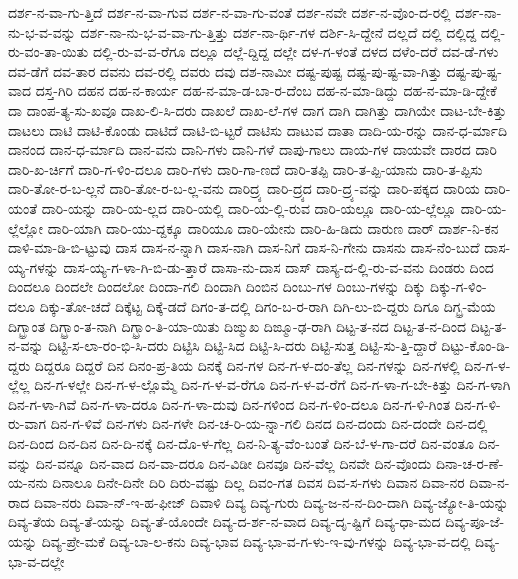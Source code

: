 {ದರ್ಶ-ನ-ವಾ-ಗು-ತ್ತಿದೆ
ದರ್ಶ-ನ-ವಾ-ಗುವ
ದರ್ಶ-ನ-ವಾ-ಗು-ವಂತೆ
ದರ್ಶ-ನವೇ
ದರ್ಶ-ನ-ವೊಂ-ದ-ರಲ್ಲಿ
ದರ್ಶ-ನಾ-ನು-ಭ-ವ-ವನ್ನು
ದರ್ಶ-ನಾ-ನು-ಭ-ವ-ವಾ-ಗು-ತ್ತಿತ್ತು
ದರ್ಶ-ನಾ-ರ್ಥಿ-ಗಳ
ದರ್ಶಿ-ಸಿ-ದ್ದೇನೆ
ದಲ್ಲದೆ
ದಲ್ಲಿ
ದಲ್ಲಿದ್ದ
ದಲ್ಲಿ-ರು-ವಂ-ತಾ-ಯಿತು
ದಲ್ಲಿ-ರು-ವ-ವ-ರೆಗೂ
ದಲ್ಲೂ
ದಲ್ಲೆ-ದ್ದಿದ್ದ
ದಲ್ಲೇ
ದಳ-ಗ-ಳಂತೆ
ದಳದ
ದಳೆಂ-ದರೆ
ದವ-ಡೆ-ಗಳು
ದವ-ಡೆಗೆ
ದವ-ತಾರ
ದವನು
ದವ-ರಲ್ಲಿ
ದವರು
ದವು
ದಶ-ನಾಮೀ
ದಷ್ಟ-ಪುಷ್ಟ
ದಷ್ಟ-ಪು-ಷ್ಟ-ವಾ-ಗಿತ್ತು
ದಷ್ಟ-ಪು-ಷ್ಟ-ವಾದ
ದಸ್ತ-ಗಿರಿ
ದಹನ
ದಹ-ನ-ಕಾರ್ಯ
ದಹ-ನ-ಮಾ-ಡ-ಬಾ-ರ-ದೆಂಬ
ದಹ-ನ-ಮಾ-ಡಿದ್ದು
ದಹ-ನ-ಮಾ-ಡಿ-ದ್ದೇಕೆ
ದಾ
ದಾಂಪ-ತ್ಯ-ಸು-ಖವೂ
ದಾಖ-ಲಿ-ಸಿ-ದರು
ದಾಖಲೆ
ದಾಖ-ಲೆ-ಗಳ
ದಾಗ
ದಾಗಿ
ದಾಗಿತ್ತು
ದಾಗಿಯೇ
ದಾಟ-ಬೇ-ಕಿತ್ತು
ದಾಟಲು
ದಾಟಿ
ದಾಟಿ-ಕೊಂಡು
ದಾಟಿದೆ
ದಾಟಿ-ಬಿ-ಟ್ಟರೆ
ದಾಟಿಸು
ದಾಟುವ
ದಾತಾ
ದಾದಿ-ಯ-ರನ್ನು
ದಾನ-ಧ-ರ್ಮಾದಿ
ದಾನಂದ
ದಾನ-ಧ-ರ್ಮಾದಿ
ದಾನ-ವನು
ದಾನಿ-ಗಳು
ದಾನಿ-ಗಳೆ
ದಾಪು-ಗಾಲು
ದಾಯ-ಗಳ
ದಾಯವೇ
ದಾರದ
ದಾರಿ
ದಾರಿ-ಖ-ರ್ಚಿಗೆ
ದಾರಿ-ಗ-ಳಿಂ-ದಲೂ
ದಾರಿ-ಗಳು
ದಾರಿ-ಗಾ-ಣದೆ
ದಾರಿ-ತಪ್ಪಿ
ದಾರಿ-ತ-ಪ್ಪಿ-ಯಾನು
ದಾರಿ-ತ-ಪ್ಪಿಸು
ದಾರಿ-ತೋ-ರ-ಬ-ಲ್ಲನೆ
ದಾರಿ-ತೋ-ರ-ಬ-ಲ್ಲ-ವನು
ದಾರಿದ್ರ್ಯ
ದಾರಿ-ದ್ರ್ಯದ
ದಾರಿ-ದ್ರ್ಯ-ವನ್ನು
ದಾರಿ-ಪಕ್ಕದ
ದಾರಿಯ
ದಾರಿ-ಯಂತೆ
ದಾರಿ-ಯನ್ನು
ದಾರಿ-ಯ-ಲ್ಲದ
ದಾರಿ-ಯಲ್ಲಿ
ದಾರಿ-ಯ-ಲ್ಲಿ-ರುವ
ದಾರಿ-ಯಲ್ಲೂ
ದಾರಿ-ಯ-ಲ್ಲೆಲ್ಲೂ
ದಾರಿ-ಯ-ಲ್ಲೆಲ್ಲೋ
ದಾರಿ-ಯಾಗಿ
ದಾರಿ-ಯು-ದ್ದಕ್ಕೂ
ದಾರಿಯೂ
ದಾರಿ-ಯೇನು
ದಾರಿ-ಹಿ-ಡಿದು
ದಾರುಣ
ದಾರ್
ದಾರ್ಶ-ನಿ-ಕನ
ದಾಳಿ-ಮಾ-ಡಿ-ಬಿ-ಟ್ಟುವು
ದಾಸ
ದಾಸ-ನ-ನ್ನಾಗಿ
ದಾಸ-ನಾಗಿ
ದಾಸ-ನಿಗೆ
ದಾಸ-ನಿ-ಗೇನು
ದಾಸನು
ದಾಸ-ನೆಂ-ಬುದೆ
ದಾಸ-ಯ್ಯ-ಗಳನ್ನು
ದಾಸ-ಯ್ಯ-ಗ-ಳಾ-ಗಿ-ಬಿ-ಡು-ತ್ತಾರೆ
ದಾಸಾ-ನು-ದಾಸ
ದಾಸ್
ದಾಸ್ಯ-ದ-ಲ್ಲಿ-ರು-ವ-ವನು
ದಿಂಡರು
ದಿಂದ
ದಿಂದಲೂ
ದಿಂದಲೇ
ದಿಂದಲೋ
ದಿಂದಾ-ಗಲಿ
ದಿಂದಾಗಿ
ದಿಂಬಿನ
ದಿಂಬು-ಗಳ
ದಿಂಬು-ಗಳನ್ನು
ದಿಕ್ಕು
ದಿಕ್ಕು-ಗ-ಳಿಂ-ದಲೂ
ದಿಕ್ಕು-ತೋ-ಚದೆ
ದಿಕ್ಕೆಟ್ಟ
ದಿಕ್ಕೆ-ಡದೆ
ದಿಗಂ-ತ-ದಲ್ಲಿ
ದಿಗಂ-ಬ-ರ-ರಾಗಿ
ದಿಗಿ-ಲು-ಬಿ-ದ್ದರು
ದಿಗೂ
ದಿಗ್ಭ್ರ-ಮೆಯ
ದಿಗ್ಭ್ರಾಂತ
ದಿಗ್ಭ್ರಾಂ-ತ-ನಾಗಿ
ದಿಗ್ಭ್ರಾಂ-ತಿ-ಯಾ-ಯಿತು
ದಿಙ್ಮುಖ
ದಿಙ್ಮೂ-ಢ-ರಾಗಿ
ದಿಟ್ಟ-ತ-ನದ
ದಿಟ್ಟ-ತ-ನ-ದಿಂದ
ದಿಟ್ಟ-ತ-ನ-ವನ್ನು
ದಿಟ್ಟಿ-ಸ-ಲಾ-ರಂ-ಭಿ-ಸಿ-ದರು
ದಿಟ್ಟಿಸಿ
ದಿಟ್ಟಿ-ಸಿದ
ದಿಟ್ಟಿ-ಸಿ-ದರು
ದಿಟ್ಟಿ-ಸುತ್ತ
ದಿಟ್ಟಿ-ಸು-ತ್ತಿ-ದ್ದಾರೆ
ದಿಟ್ಟು-ಕೊಂ-ಡಿ-ದ್ದರು
ದಿದ್ದರೂ
ದಿದ್ದರೆ
ದಿನ
ದಿನಂ-ಪ್ರ-ತಿಯ
ದಿನಕ್ಕೆ
ದಿನ-ಗಳ
ದಿನ-ಗ-ಳ-ದಂ-ತೆಲ್ಲ
ದಿನ-ಗಳನ್ನು
ದಿನ-ಗಳಲ್ಲಿ
ದಿನ-ಗ-ಳ-ಲ್ಲೆಲ್ಲ
ದಿನ-ಗ-ಳಲ್ಲೇ
ದಿನ-ಗ-ಳ-ಲ್ಲೊಮ್ಮೆ
ದಿನ-ಗ-ಳ-ವ-ರೆಗೂ
ದಿನ-ಗ-ಳ-ವ-ರೆಗೆ
ದಿನ-ಗ-ಳಾ-ಗ-ಬೇ-ಕಿತ್ತು
ದಿನ-ಗ-ಳಾಗಿ
ದಿನ-ಗ-ಳಾ-ಗಿವೆ
ದಿನ-ಗ-ಳಾ-ದರೂ
ದಿನ-ಗ-ಳಾ-ದುವು
ದಿನ-ಗಳಿಂದ
ದಿನ-ಗ-ಳಿಂ-ದಲೂ
ದಿನ-ಗ-ಳಿ-ಗಿಂತ
ದಿನ-ಗ-ಳಿ-ರು-ವಾಗ
ದಿನ-ಗ-ಳಿವೆ
ದಿನ-ಗಳು
ದಿನ-ಗಳೇ
ದಿನ-ಚ-ರಿ-ಯ-ನ್ನಾ-ಗಲಿ
ದಿನದ
ದಿನ-ದಂದು
ದಿನ-ದಂದೇ
ದಿನ-ದಲ್ಲಿ
ದಿನ-ದಿಂದ
ದಿನ-ದಿನ
ದಿನ-ದಿ-ನಕ್ಕೆ
ದಿನ-ದೊ-ಳ-ಗೆಲ್ಲ
ದಿನ-ನಿ-ತ್ಯ-ವೆಂ-ಬಂತೆ
ದಿನ-ಬೆ-ಳ-ಗಾ-ದರೆ
ದಿನ-ವಂತೂ
ದಿನ-ವನ್ನು
ದಿನ-ವನ್ನೂ
ದಿನ-ವಾದ
ದಿನ-ವಾ-ದರೂ
ದಿನ-ವಿಡೀ
ದಿನವೂ
ದಿನ-ವೆಲ್ಲ
ದಿನವೇ
ದಿನ-ವೊಂದು
ದಿನಾ-ಚ-ರ-ಣೆ-ಯ-ನನು
ದಿನಾಲೂ
ದಿನೇ-ದಿನೇ
ದಿರಿ
ದಿರು-ವಷ್ಟು
ದಿಲ್ಲ
ದಿವಂ-ಗತ
ದಿವಸ
ದಿವ-ಸ-ಗಳು
ದಿವಾನ
ದಿವಾ-ನರ
ದಿವಾ-ನ-ರಾದ
ದಿವಾ-ನರು
ದಿವಾ-ನ್-ಇ-ಹ-ಫೀಜ್
ದಿವಾಳಿ
ದಿವ್ಯ
ದಿವ್ಯ-ಗುರು
ದಿವ್ಯ-ಜ-ನ-ನ-ದಿಂ-ದಾಗಿ
ದಿವ್ಯ-ಜ್ಯೋ-ತಿ-ಯನ್ನು
ದಿವ್ಯ-ತೆಯ
ದಿವ್ಯ-ತೆ-ಯನ್ನು
ದಿವ್ಯ-ತೆ-ಯೊಂದೇ
ದಿವ್ಯ-ದ-ರ್ಶ-ನ-ವಾದ
ದಿವ್ಯ-ದೃ-ಷ್ಟಿಗೆ
ದಿವ್ಯ-ಧಾ-ಮದ
ದಿವ್ಯ-ಪೂ-ಜೆ-ಯನ್ನು
ದಿವ್ಯ-ಪ್ರೇ-ಮಕೆ
ದಿವ್ಯ-ಬಾ-ಲ-ಕನು
ದಿವ್ಯ-ಭಾವ
ದಿವ್ಯ-ಭಾ-ವ-ಗ-ಳು-ಇ-ವು-ಗಳನ್ನು
ದಿವ್ಯ-ಭಾ-ವ-ದಲ್ಲಿ
ದಿವ್ಯ-ಭಾ-ವ-ದಲ್ಲೇ
}
